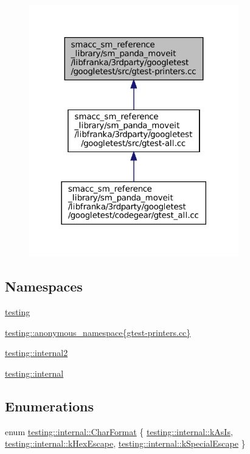 \begin{figure}[H]
\begin{center}
\leavevmode
\includegraphics[width=258pt]{gtest-printers_8cc__dep__incl}
\end{center}
\end{figure}
\subsection*{Namespaces}
\begin{DoxyCompactItemize}
\item 
 \hyperlink{namespacetesting}{testing}
\item 
 \hyperlink{namespacetesting_1_1anonymous__namespace_02gtest-printers_8cc_03}{testing\+::anonymous\+\_\+namespace\{gtest-\/printers.\+cc\}}
\item 
 \hyperlink{namespacetesting_1_1internal2}{testing\+::internal2}
\item 
 \hyperlink{namespacetesting_1_1internal}{testing\+::internal}
\end{DoxyCompactItemize}
\subsection*{Enumerations}
\begin{DoxyCompactItemize}
\item 
enum \hyperlink{namespacetesting_1_1internal_ae2ef98247c76a50cdc80ceb4a6c81793}{testing\+::internal\+::\+Char\+Format} \{ \hyperlink{namespacetesting_1_1internal_ae2ef98247c76a50cdc80ceb4a6c81793af7038866be92e9978360b831e376ffaa}{testing\+::internal\+::k\+As\+Is}, 
\hyperlink{namespacetesting_1_1internal_ae2ef98247c76a50cdc80ceb4a6c81793aebfa5293302338a8e8678744c103f113}{testing\+::internal\+::k\+Hex\+Escape}, 
\hyperlink{namespacetesting_1_1internal_ae2ef98247c76a50cdc80ceb4a6c81793ae1211108e9f35f891d9951da64794d03}{testing\+::internal\+::k\+Special\+Escape}
 \}
\end{DoxyCompactItemize}
